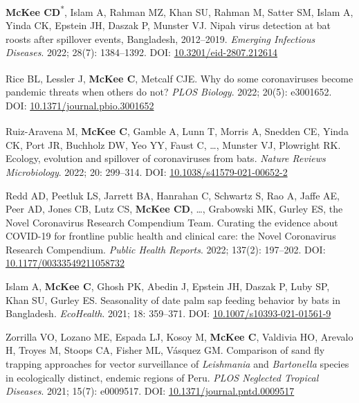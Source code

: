 \documentclass{cv}
\begin{document}
\begin{pubenum}
\item \textbf{McKee CD}\textsuperscript{*\dag}, Islam A\textsuperscript{\dag}, Rahman MZ, Khan SU, Rahman M, Satter SM, Islam A, Yinda CK, Epstein JH, Daszak P, Munster VJ. Nipah virus detection at bat roosts after spillover events, Bangladesh, 2012--2019. \textit{Emerging Infectious Diseases}. 2022; 28(7): 1384--1392. DOI: \href{https://doi.org/10.3201/eid2807.212614}{10.3201/eid-2807.212614}

\item Rice BL\textsuperscript{\dag}, Lessler J\textsuperscript{\dag}, \textbf{McKee C}\textsuperscript{\dag}, Metcalf CJE\textsuperscript{\dag}. Why do some coronaviruses become pandemic threats when others do not? \textit{PLOS Biology}. 2022; 20(5): e3001652. DOI: \href{https://doi.org/10.1371/journal.pbio.3001652}{10.1371/journal.pbio.3001652}

\item Ruiz-Aravena M\textsuperscript{\dag}, \textbf{McKee C}\textsuperscript{\dag}, Gamble A, Lunn T, Morris A, Snedden CE, Yinda CK, Port JR, Buchholz DW, Yeo YY, Faust C, …, Munster VJ, Plowright RK. Ecology, evolution and spillover of coronaviruses from bats. \textit{Nature Reviews Microbiology}. 2022; 20: 299--314. DOI: \href{https://doi.org/10.1038/s41579-021-00652-2}{10.1038/s41579-021-00652-2}

\item Redd AD, Peetluk LS, Jarrett BA, Hanrahan C, Schwartz S, Rao A, Jaffe AE, Peer AD, Jones CB, Lutz CS, \textbf{McKee CD}, …, Grabowski MK, Gurley ES, the Novel Coronavirus Research Compendium Team. Curating the evidence about COVID-19 for frontline public health and clinical care: the Novel Coronavirus Research Compendium. \textit{Public Health Reports}. 2022; 137(2): 197--202. DOI: \href{https://doi.org/10.1177/00333549211058732}{10.1177/00333549211058732}

\item Islam A, \textbf{McKee C}, Ghosh PK, Abedin J, Epstein JH, Daszak P, Luby SP, Khan SU, Gurley ES. Seasonality of date palm sap feeding behavior by bats in Bangladesh. \textit{EcoHealth}. 2021; 18: 359--371. DOI: \href{https://doi.org/10.1007/s10393-021-01561-9}{10.1007/s10393-021-01561-9}

\item Zorrilla VO, Lozano ME, Espada LJ, Kosoy M, \textbf{McKee C}, Valdivia HO, Arevalo H, Troyes M, Stoops CA, Fisher ML, Vásquez GM. Comparison of sand fly trapping approaches for vector surveillance of \textit{Leishmania} and \textit{Bartonella} species in ecologically distinct, endemic regions of Peru. \textit{PLOS Neglected Tropical Diseases}. 2021; 15(7): e0009517. DOI: \href{https://doi.org/10.1371/journal.pntd.0009517}{10.1371/journal.pntd.0009517}


\end{pubenum}
\end{document}

